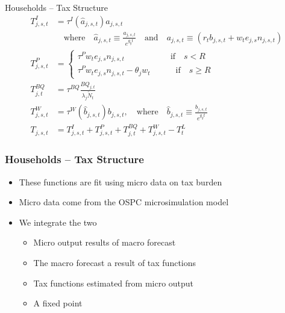 \documentclass{beamer}
\begin{document}
  \begin{frame}{Households -- Tax Structure}
    \begin{align}
      T^I_{j,s,t} & = \tau^I(\hat{a}_{j,s,t})a_{j,s,t} \nonumber \\
      & \quad\text{where}\quad \hat{a}_{j,s,t}\equiv\frac{a_{j,s,t}}{e^{g_y t}} \quad\text{and}\quad a_{j,s,t} \equiv (r_t b_{j,s,t} + w_t e_{j,s}n_{j,s,t}) \nonumber \\
      T^P_{j,s,t} & =
        \begin{cases}
          \tau^P w_t e_{j,s}n_{j,s,t} \quad\quad\quad\quad\quad\:\:\text{if}\quad s<R \\
          \tau^P w_t e_{j,s}n_{j,s,t} - \theta_j w_t \quad\quad\quad\text{if}\quad s\geq R
        \end{cases}  \nonumber \\
      T^{BQ}_{j,t} & = \tau^{BQ} \frac{BQ_{j,t}}{\lambda_j\tilde{N}_t}  \nonumber \\
      T^W_{j,s,t} & = \tau^W(\hat b_{j,s,t}) b_{j,s,t},\quad\text{where}\quad \hat{b}_{j,s,t}\equiv\frac{b_{j,s,t}}{e^{g_y t}}  \nonumber \\
      T_{j,s,t} & = T^I_{j,s,t} + T^P_{j,s,t} + T^{BQ}_{j,t} + T^W_{j,s,t} - T^L_{t} \nonumber
    \end{align}
  \end{frame}

    \begin{frame}
    \frametitle{Households -- Tax Structure}
      \begin{itemize}
      \item These functions are fit using micro data on tax burden
      \item Micro data come from the OSPC microsimulation model
      \item We integrate the two
      	\begin{itemize}
	\item Micro output results of macro forecast
	\item The macro forecast a result of tax functions
	\item Tax functions estimated from micro output
	\item A fixed point
	\end{itemize}
      \end{itemize}
  \end{frame}
\end{document}
